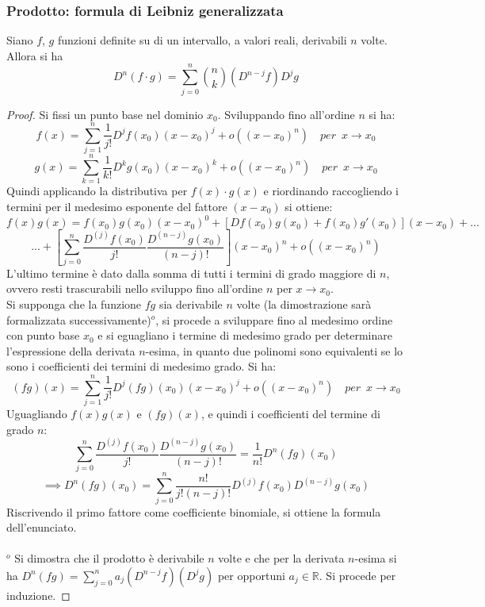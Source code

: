\documentclass[10pt, oneside]{book}
\theoremstyle{plain}
\begin{document}
\subsubsection{Prodotto: formula di Leibniz generalizzata}
\begin{ther}
Siano $f$, $g$ funzioni definite su di un intervallo, a valori reali, derivabili $n$ volte. Allora si ha
\[D^n(f \cdot g) = \sum \limits_{j=0}^{n}\binom{n}{k} (D^{n-j}f) D^jg\]
\end{ther}
\begin{proof}
Si fissi un punto base nel dominio $x_0$. Sviluppando fino all'ordine $n$ si ha:
\[f(x) = \sum \limits_{j = 1}^n \frac{1}{j!}D^{j}f(x_0) (x - x_0)^j + o((x-x_0)^n) \quad per \enspace x \rightarrow x_0\]
\[g(x) = \sum \limits_{k = 1}^n \frac{1}{k!}D^{k}g(x_0) (x - x_0)^k + o((x-x_0)^n) \quad per \enspace x \rightarrow x_0\]
Quindi applicando la distributiva per $f(x) \cdot g(x)$ e riordinando raccogliendo i termini per il medesimo esponente del fattore $(x - x_0)$ si ottiene:
\[f(x) g(x) = f(x_0) g(x_0) (x-x_0)^0 + [Df(x_0) g(x_0) + f(x_0) g'(x_0)](x-x_0) + ... \]
\[ ... + [\sum \limits_{j=0}^{n} \frac{D^{(j)}f(x_0)}{j!} \frac{D^{(n-j)}g(x_0)}{(n-j)!}](x-x_0)^n + o((x-x_0)^n)\]
L'ultimo termine è dato dalla somma di tutti i termini di grado maggiore di $n$, ovvero resti trascurabili nello sviluppo fino all'ordine $n$ per $x \rightarrow x_0$.
\\Si supponga che la funzione $fg$ sia derivabile $n$ volte (la dimostrazione sarà formalizzata successivamente)\hyperlink{dopo}{$^o$}, si procede a sviluppare fino al medesimo ordine con punto base $x_0$ e si eguagliano i termine di medesimo grado per determinare l'espressione della derivata $n$-esima, in quanto due polinomi sono equivalenti se lo sono i coefficienti dei termini di medesimo grado. Si ha:
\[(fg)(x) = \sum \limits_{j = 1}^n \frac{1}{j!}D^{j}(fg)(x_0) (x - x_0)^j + o((x-x_0)^n) \quad per \enspace x \rightarrow x_0\]
Uguagliando $f(x)g(x)$ e $(fg)(x)$, e quindi i coefficienti del termine di grado $n$:
\[\sum \limits_{j=0}^{n} \frac{D^{(j)}f(x_0)}{j!} \frac{D^{(n-j)}g(x_0)}{(n-j)!} = \frac{1}{n!}D^{n}(fg)(x_0)\]
\[\implies D^{n}(fg)(x_0) = \sum \limits_{j=0}^{n} \frac{n!}{j! (n-j)!} D^{(j)}f(x_0) D^{(n-j)}g(x_0)\]
Riscrivendo il primo fattore come coefficiente binomiale, si ottiene la formula dell'enunciato.
\\~\\\hypertarget{dopo}{$^o$} Si dimostra che il prodotto è derivabile $n$ volte e che per la derivata $n$-esima si ha $D^n(fg) = \sum \limits_{j=0}^{n} a_j (D^{n-j}f)(D^jg)$ per opportuni $a_j \in \mathbb{R}$. Si procede per induzione.

\end{proof}
\end{document}
